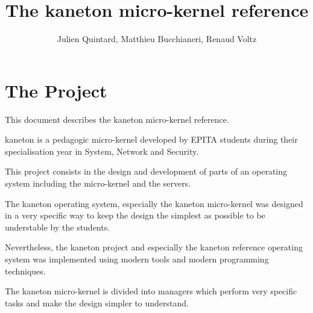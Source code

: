 
%
%



%
%


%
%

\title{The kaneton micro-kernel reference}

%
%

\author{\small{Julien Quintard}, \small{Matthieu Bucchianeri}, \small{Renaud Voltz}}

%
%



%
%

\maketitle

%
%



%
%

\section{The Project}

This document describes the kaneton micro-kernel reference.

kaneton is a pedagogic micro-kernel developed by EPITA students during
their specialisation year in System, Network and Security.

This project consists in the design and development of parts of an
operating system including the micro-kernel and the servers.

The kaneton operating system, especially the kaneton micro-kernel was
designed in a very specific way to keep the design the simplest as possible
to be understable by the students.

Nevertheless, the kaneton project and especially the kaneton reference
operating system was implemented using modern tools and modern
programming techniques.

The kaneton micro-kernel is divided into managers which perform very
specific tasks and make the design simpler to understand.

